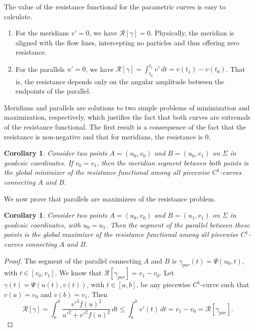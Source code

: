 \documentclass[a4paper,12pt]{amsart}
\newtheorem{corollary}[theorem]{Corollary}
\theoremstyle{definition}
\def\R{\mathcal{ R}}
\begin{document}
 The value of the resistance functional     for the parametric curves is easy to calculate. 
 \begin{enumerate}
 \item For the meridians $v' = 0$, we have $\R[\gamma] = 0$. Physically, the meridian is aligned with the flow lines, intercepting no particles and thus offering zero resistance.
 \item For the parallels $u' = 0$, we have $\R[\gamma] = \int_{t_0}^{t_1} v' \, dt = v(t_1)-v(t_0)$. That is, the resistance depends only on the angular amplitude between  the endpoints of the parallel.
\end{enumerate}

Meridians and parallels are solutions to two simple problems of minimization and maximization, respectively, which justifies the fact that both curves are extremals of the resistance functional. The first result is a consequence of the fact that the resistance is non-negative and that for meridians, the resistance is $0$. 


\begin{corollary}
Consider two points $A = (u_0, v_0)$ and $B = (u_0, v_1)$ on $\Sigma$ in geodesic coordinates. If $v_0 = v_1$, then the meridian segment between both points is the global minimizer of the resistance functional among all piecewise $C^1$-curves connecting $A$ and $B$. 
\end{corollary}

 
We now prove that parallels are maximizers of the resistance problem. 

\begin{corollary}\label{co34}
Consider two points $A = (u_0, v_0)$ and $B = (u_1, v_1)$ on $\Sigma$ in geodesic coordinates, with $u_0 =u_1$. Then the segment of the parallel between these points is the global maximizer of the resistance functional among all piecewise $C^1$-curves connecting $A$ and $B$. 
\end{corollary}

\begin{proof} The segment of the parallel connecting $A$ and $B$ is $\gamma_{par}(t)=\Psi(u_0,t)$, with $t\in [v_0,v_1]$. We know that $\R[\gamma_{par}]=v_1-v_0$. Let $ \gamma(t)=\Psi(u(t),v(t))$, with $t\in [a,b]$, be any piecewise $C^1$-curve such that $v(a)=v_0$ and $v(b)=v_1$. Then 
$$\R[\gamma] = \int_a^b \frac{v'^3 f(u)^2}{u'^2 +v'^2 f(u)^2} \, dt\leq \int_a^b v'(t) \, dt=v_1-v_0=\R[\gamma_{par}].$$
\end{proof}
\end{document}
